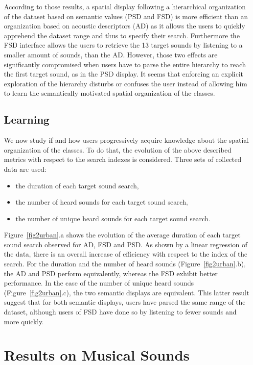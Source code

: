 \documentclass{aes2e}
\begin{document}
According to those results, a spatial display following a hierarchical organization of the dataset based on semantic values (PSD and FSD) is more efficient than an organization based on acoustic descriptors (AD) as it allows the users to quickly apprehend the dataset range and thus to specify their search. Furthermore the FSD interface allows the users to retrieve the 13 target sounds by listening to a smaller amount of sounds, than the AD. However, those two effects are significantly compromised when users have to parse the entire hierarchy to reach the first target sound, as in the PSD display. It seems that enforcing an explicit exploration of the hierarchy disturbs or confuses the user instead of allowing him to learn the semantically motivated spatial organization of the classes. 


\subsection{Learning}

We now study if and how users progressively acquire knowledge about the spatial organization of the classes. To do that, the evolution of the above described metrics with respect to the search indexes is considered. Three sets of collected data are used:

\begin{itemize}
\item the duration of each target sound search,
\item the number of heard sounds for each target sound search,
\item the number of unique heard sounds for each target sound search. 
\end{itemize}

Figure~\ref{fig2urban}.a shows the evolution of the average duration of each target sound search observed for AD, FSD and PSD. As shown by a linear regression of the data, there is an overall increase of efficiency with respect to the index of the search. For the duration and the number of heard sounds (Figure~\ref{fig2urban}.b), the AD and PSD perform equivalently, whereas the FSD exhibit better performance. In the case of the number of unique heard sounds (Figure~\ref{fig2urban}.c), the two semantic displays are equivalent. This latter result suggest that for both semantic displays, users have parsed the same range of the dataset, although users of FSD have done so by listening to fewer sounds and more quickly. 

\section{Results on Musical Sounds}
\end{document}
